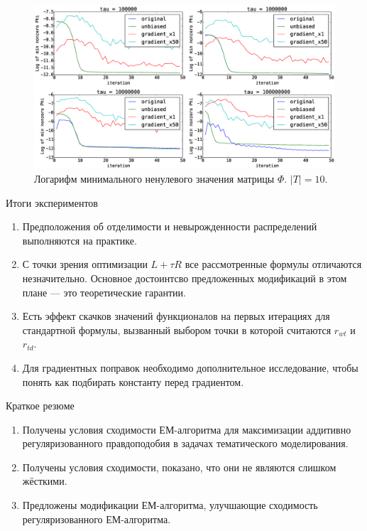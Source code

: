 \documentclass[utf8]{beamer}
\begin{document}
	\begin{frame}
\begin{figure}
	\centering
	\caption{Логарифм минимального ненулевого значения матрицы $\Phi$. $|T| = 10$.}    
	\includegraphics[width=1.0\linewidth]{presentation_pictures/topics_10_minPhi_values}
\end{figure}
	\end{frame}
	
\begin{frame}{Итоги экспериментов}
\begin{enumerate}
\item Предположения об отделимости и невырожденности распределений выполняются на практике.
\item С точки зрения оптимизации $L + \tau R$ все рассмотренные формулы отличаются незначительно. Основное достоинтсво предложенных модификаций в этом плане --- это теоретические гарантии.
\item Есть эффект скачков значений функционалов на первых итерациях для стандартной формулы, вызванный выбором точки в которой считаются $r_{wt}$ и $r_{td}$.
\item Для градиентных поправок необходимо дополнительное исследование, чтобы понять как подбирать константу перед градиентом.
\end{enumerate}
\end{frame}

	\begin{frame}{Краткое резюме}
 \begin{enumerate}
\item  Получены условия сходимости ЕМ-алгоритма для максимизации аддитивно регуляризованного правдоподобия в задачах тематического моделирования.
\item Получены условия сходимости, показано, что они не являются слишком жёсткими. 
\item Предложены модификации ЕМ-алгоритма, улучшающие сходимость регуляризованного ЕМ-алгоритма.
\end{enumerate}
	\end{frame}
\end{document}

